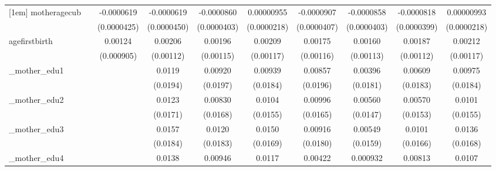 \begin{table}[htbp]
\begin{tabular}{l*{9}{c}}
[1em]
motheragecub&                     &  -0.0000619         &  -0.0000619         &  -0.0000860\sym{**} &  0.00000955         &  -0.0000907\sym{**} &  -0.0000858\sym{**} &  -0.0000818\sym{**} &  0.00000993         \\
            &                     & (0.0000425)         & (0.0000450)         & (0.0000403)         & (0.0000218)         & (0.0000407)         & (0.0000403)         & (0.0000399)         & (0.0000218)         \\
[1em]
agefirstbirth&                     &     0.00124         &     0.00206\sym{*}  &     0.00196\sym{*}  &     0.00209\sym{*}  &     0.00175         &     0.00160         &     0.00187\sym{*}  &     0.00212\sym{*}  \\
            &                     &  (0.000905)         &   (0.00112)         &   (0.00115)         &   (0.00117)         &   (0.00116)         &   (0.00113)         &   (0.00112)         &   (0.00117)         \\
[1em]
\_mother\_edu1&                     &                     &      0.0119         &     0.00920         &     0.00939         &     0.00857         &     0.00396         &     0.00609         &     0.00975         \\
            &                     &                     &    (0.0194)         &    (0.0197)         &    (0.0184)         &    (0.0196)         &    (0.0181)         &    (0.0183)         &    (0.0184)         \\
[1em]
\_mother\_edu2&                     &                     &      0.0123         &     0.00830         &      0.0104         &     0.00996         &     0.00560         &     0.00570         &      0.0101         \\
            &                     &                     &    (0.0171)         &    (0.0168)         &    (0.0155)         &    (0.0165)         &    (0.0147)         &    (0.0153)         &    (0.0155)         \\
[1em]
\_mother\_edu3&                     &                     &      0.0157         &      0.0120         &      0.0150         &     0.00916         &     0.00549         &      0.0101         &      0.0136         \\
            &                     &                     &    (0.0184)         &    (0.0183)         &    (0.0169)         &    (0.0180)         &    (0.0159)         &    (0.0166)         &    (0.0168)         \\
[1em]
\_mother\_edu4&                     &                     &      0.0138         &     0.00946         &      0.0117         &     0.00422         &    0.000932         &     0.00813         &      0.0107         \\

\end{tabular}
\end{table}

